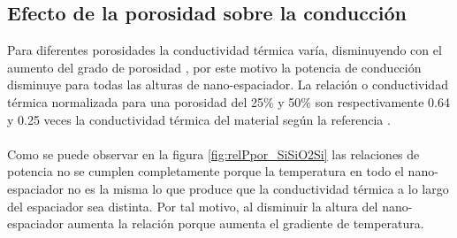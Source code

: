\subsection{Efecto de la porosidad sobre la conducción}
Para diferentes porosidades la conductividad térmica varía, disminuyendo con el aumento del grado de porosidad \cite{ThermalConductivity_SiO2_2018}, por este motivo la potencia de conducción disminuye para todas las alturas de nano-espaciador. La relación o conductividad térmica normalizada para una porosidad del 25\% y 50\% son respectivamente 0.64 y 0.25 veces la conductividad térmica del material según la referencia \cite{ThermalConductivity_SiO2_2018}.\\\\
Como se puede observar en la figura \ref{fig:relPpor_SiSiO2Si} las relaciones de potencia no se cumplen completamente porque la temperatura en todo el nano-espaciador no es la misma lo que produce que la conductividad térmica a lo largo del espaciador sea distinta. Por tal motivo, al disminuir la altura del nano-espaciador aumenta la relación porque aumenta el gradiente de temperatura.
